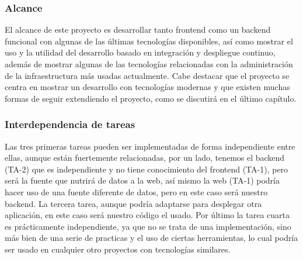 \subsubsection{Alcance}
El alcance de este proyecto es desarrollar tanto \gls{frontend} como un backend funcional con algunas de las últimas tecnologías disponibles,
así como mostrar el uso y la utilidad del desarrollo basado en integración y despliegue continuo, además de mostrar algunas de 
las tecnologías relacionadas con la administración de la infraestructura más usadas actualmente. Cabe destacar que el proyecto se centra
en mostrar un desarrollo con tecnologías modernas y que existen muchas formas de seguir extendiendo el proyecto, como se discutirá en el 
último capítulo.


\subsubsection{Interdependencia de tareas}
Las tres primeras tareas pueden ser implementadas de forma independiente entre ellas, aunque están fuertemente relacionadas, por un lado, tenemos el backend (TA-2) que es independiente y no tiene conocimiento del frontend (TA-1), pero será la fuente que nutrirá de datos a la web, así mismo la web (TA-1) podría hacer uso de una fuente diferente de datos, pero en este caso será nuestro backend. La tercera tarea, aunque podría adaptarse para desplegar otra aplicación, en este caso será nuestro código el usado. Por último la tarea cuarta es prácticamente independiente, ya que no se trata de una implementación, sino más bien de una serie de practicas y el uso de ciertas herramientas, lo cual podría ser usado en cualquier otro proyectos con tecnologías similares.

